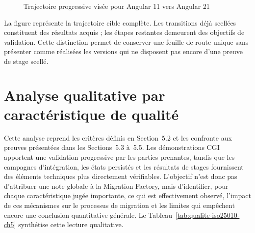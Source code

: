 \begin{figure}[H]
    \centering
    \caption{Trajectoire progressive visée pour Angular 11 vers Angular 21}
    \label{fig:roadmap-angular-11-21-ch5}
\end{figure}

La figure représente la trajectoire cible complète. Les transitions déjà scellées constituent des résultats acquis ; les étapes restantes demeurent des objectifs de validation. Cette distinction permet de conserver une feuille de route unique sans présenter comme réalisées les versions qui ne disposent pas encore d'une preuve de stage scellé.

\section{Analyse qualitative par caractéristique de qualité}

Cette analyse reprend les critères définis en Section~5.2 et les confronte aux preuves présentées dans les Sections~5.3 à~5.5. Les démonstrations CGI apportent une validation progressive par les parties prenantes, tandis que les campagnes d'intégration, les états persistés et les résultats de stages fournissent des éléments techniques plus directement vérifiables. L'objectif n'est donc pas d'attribuer une note globale à la Migration Factory, mais d'identifier, pour chaque caractéristique jugée importante, ce qui est effectivement observé, l'impact de ces mécanismes sur le processus de migration et les limites qui empêchent encore une conclusion quantitative générale. Le Tableau~\ref{tab:qualite-iso25010-ch5} synthétise cette lecture qualitative.

